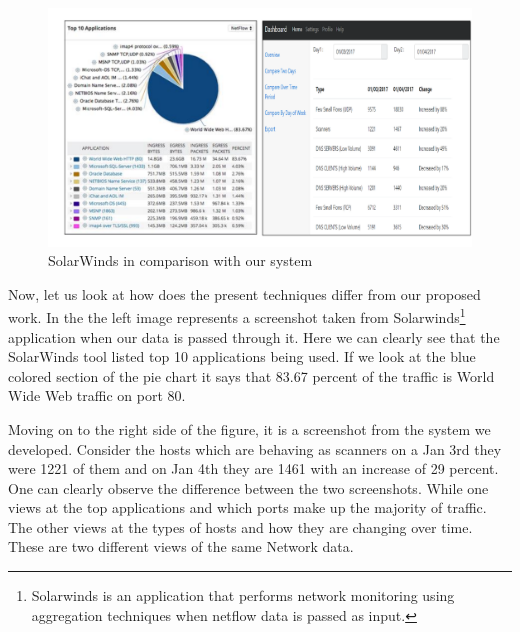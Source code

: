 \begin{figure}[b]
	\centerline{\includegraphics[scale = 0.5]{intro.pdf}}
	\caption{SolarWinds in comparison with our system}%
\end{figure}

Now, let us look at how does the present techniques differ from our proposed work. In the  the left image represents a screenshot taken from Solarwinds\footnote{Solarwinds is an application that performs network monitoring using aggregation techniques when netflow data is passed as input.} application when our data is passed through it. Here we can clearly see that the SolarWinds tool listed top 10 applications being used. If we look at the blue colored section of the pie chart it says that 83.67 percent of the traffic is World Wide Web traffic on port 80. 

Moving on to the right side of the figure, it is a screenshot from the system we developed. Consider the hosts which are behaving as scanners on a Jan 3rd they were 1221 of them and on Jan 4th they are 1461 with an increase of 29 percent. One can clearly observe the difference between the two screenshots. While one views at the top applications and which ports make up the majority of traffic. The other views at the types of hosts and how they are changing over time. These are two different views of the same Network data.

